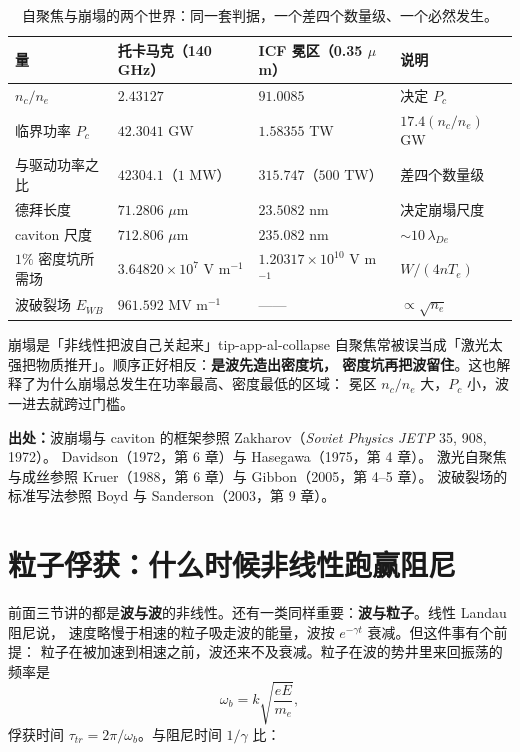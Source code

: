 \begin{table}[htbp]
\centering
\small
\caption{自聚焦与崩塌的两个世界：同一套判据，一个差四个数量级、一个必然发生。}
\label{tab:app-al-collapse}
\begin{tabular}{p{3.4cm}p{3.6cm}p{3.6cm}p{3.2cm}}
\toprule
量 & 托卡马克（140 GHz） & ICF 冕区（0.35 $\mu$m） & 说明 \\
\midrule
$n_c/n_e$ & $2.43127$ & $91.0085$ & 决定 $P_c$ \\
临界功率 $P_c$ & $42.3041$ GW & $1.58355$ TW & $17.4(n_c/n_e)$ GW \\
与驱动功率之比 & $42304.1$（$1$ MW） & $315.747$（$500$ TW） & 差四个数量级 \\
德拜长度 & $71.2806$ $\mu$m & $23.5082$ nm & 决定崩塌尺度 \\
caviton 尺度 & $712.806$ $\mu$m & $235.082$ nm & $\sim10\,\lambda_{De}$ \\
$1\%$ 密度坑所需场 & $3.64820\times10^{7}$ V m$^{-1}$ & $1.20317\times10^{10}$ V m$^{-1}$ & $W/(4nT_e)$ \\
波破裂场 $E_{WB}$ & $961.592$ MV m$^{-1}$ & —— & $\propto\sqrt{n_e}$ \\
\bottomrule
\end{tabular}

\end{table}

\begin{tip}{崩塌是「非线性把波自己关起来」}{tip-app-al-collapse}
自聚焦常被误当成「激光太强把物质推开」。顺序正好相反：\textbf{是波先造出密度坑，
密度坑再把波留住}。这也解释了为什么崩塌总发生在功率最高、密度最低的区域：
冕区 $n_c/n_e$ 大，$P_c$ 小，波一进去就跨过门槛。
\end{tip}

{\footnotesize
\textbf{出处：}波崩塌与 caviton 的框架参照 Zakharov（\emph{Soviet Physics JETP} 35, 908, 1972）。
Davidson（1972，第 6 章）与 Hasegawa（1975，第 4 章）。
激光自聚焦与成丝参照
Kruer（1988，第 6 章）与 Gibbon（2005，第 4--5 章）。
波破裂场的标准写法参照
Boyd 与 Sanderson（2003，第 9 章）。
}

\section{粒子俘获：什么时候非线性跑赢阻尼}
\label{sec:app-al-trapping}

前面三节讲的都是\textbf{波与波}的非线性。还有一类同样重要：\textbf{波与粒子}。线性 Landau 阻尼说，
速度略慢于相速的粒子吸走波的能量，波按 $e^{-\gamma t}$ 衰减。但这件事有个前提：
粒子在被加速到相速之前，波还来不及衰减。粒子在波的势井里来回振荡的频率是
\begin{equation}
\omega_b = k\sqrt{\frac{eE}{m_e}} ,
\label{eq:app-al-omegab}
\end{equation}
俘获时间 $\tau_{tr} = 2\pi/\omega_b$。与阻尼时间 $1/\gamma$ 比：

